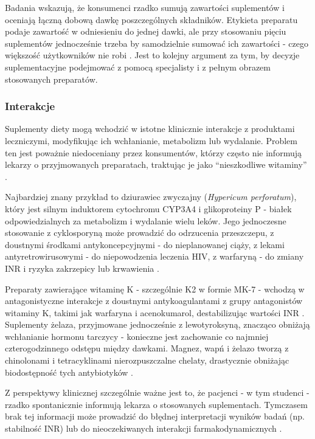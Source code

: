 Badania wskazują, że konsumenci rzadko sumują zawartości suplementów i oceniają łączną dobową dawkę poszczególnych składników. Etykieta preparatu podaje zawartość w odniesieniu do jednej dawki, ale przy stosowaniu pięciu suplementów jednocześnie trzeba by samodzielnie sumować ich zawartości - czego większość użytkowników nie robi \cite{jarosz2020normy}. Jest to kolejny argument za tym, by decyzje suplementacyjne podejmować z pomocą specjalisty i z pełnym obrazem stosowanych preparatów.


\subsubsection{Interakcje}

Suplementy diety mogą wchodzić w istotne klinicznie interakcje z produktami leczniczymi, modyfikując ich wchłanianie, metabolizm lub wydalanie. Problem ten jest poważnie niedoceniany przez konsumentów, którzy często nie informują lekarzy o przyjmowanych preparatach, traktując je jako \enquote{nieszkodliwe witaminy} \cite{navarro2017liver}.

Najbardziej znany przykład to dziurawiec zwyczajny (\textit{Hypericum perforatum}), który jest silnym induktorem cytochromu CYP3A4 i glikoproteiny P - białek odpowiedzialnych za metabolizm i wydalanie wielu leków. Jego jednoczesne stosowanie z cyklosporyną może prowadzić do odrzucenia przeszczepu, z doustnymi środkami antykoncepcyjnymi - do nieplanowanej ciąży, z lekami antyretrowirusowymi - do niepowodzenia leczenia HIV, z warfaryną - do zmiany INR i ryzyka zakrzepicy lub krwawienia \cite{navarro2017liver}.

Preparaty zawierające witaminę K - szczególnie K2 w formie MK-7 - wchodzą w antagonistyczne interakcje z doustnymi antykoagulantami z grupy antagonistów witaminy K, takimi jak warfaryna i acenokumarol, destabilizując wartości INR \cite{navarro2017liver}. Suplementy żelaza, przyjmowane jednocześnie z lewotyroksyną, znacząco obniżają wchłanianie hormonu tarczycy - konieczne jest zachowanie co najmniej czterogodzinnego odstępu między dawkami. Magnez, wapń i żelazo tworzą z chinolonami i tetracyklinami nierozpuszczalne chelaty, drastycznie obniżając biodostępność tych antybiotyków \cite{navarro2017liver}.

Z perspektywy klinicznej szczególnie ważne jest to, że pacjenci - w tym studenci - rzadko spontanicznie informują lekarza o stosowanych suplementach. Tymczasem brak tej informacji może prowadzić do błędnej interpretacji wyników badań (np. stabilność INR) lub do nieoczekiwanych interakcji farmakodynamicznych \cite{navarro2017liver}.


